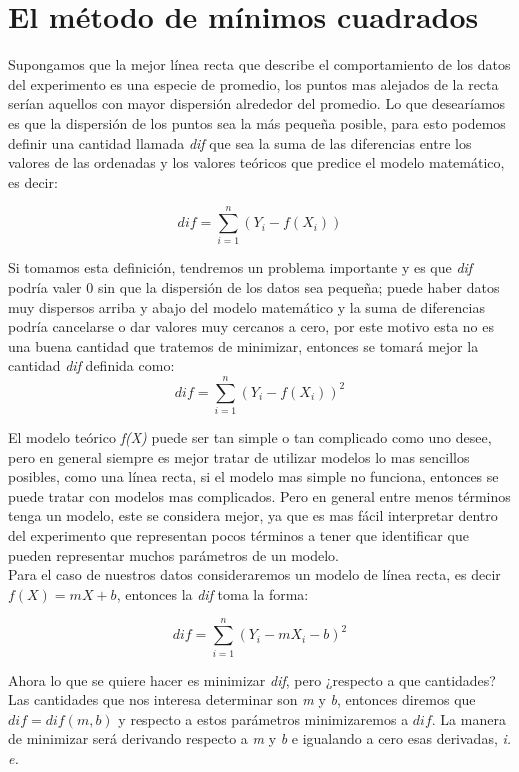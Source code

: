 \documentclass[12pt,letterpaper]{report}
\begin{document}
\section{El método de mínimos cuadrados}


Supongamos que la mejor línea recta que describe el comportamiento de los datos del experimento es una especie de promedio, los puntos mas alejados de la recta serían aquellos con mayor dispersión alrededor del promedio. Lo que desearíamos es que la dispersión de los puntos sea la más pequeña posible, para esto podemos definir una cantidad llamada \textit{dif} que sea la suma de las diferencias entre los valores de las ordenadas y los valores teóricos que predice el modelo matemático, es decir:

\begin{equation}
dif= \sum_{i=1}^{n}(Y_{i}-f(X_{i}))
\end{equation}

Si tomamos esta definición, tendremos un problema importante y es que \textit{dif} podría valer 0 sin que la dispersión de los datos sea pequeña; puede haber datos muy dispersos arriba y abajo del modelo matemático y la suma de diferencias podría cancelarse o dar valores muy cercanos a cero, por este motivo esta no es una buena cantidad  que tratemos de minimizar, entonces  se tomará mejor la cantidad \textit{dif} definida como:
\begin{equation}\label{eqdif}
dif= \sum_{i=1}^{n}(Y_{i}-f(X_{i}))^{2}
\end{equation}

El modelo teórico \textit{f(X)} puede ser tan simple o tan complicado como uno desee, pero en general siempre es mejor tratar de utilizar modelos lo mas sencillos posibles, como una línea recta, si el modelo mas simple no funciona, entonces se puede tratar con modelos mas complicados. Pero en general entre menos términos tenga un modelo, este se considera mejor, ya que es mas fácil interpretar dentro del experimento que representan pocos términos a tener que identificar que pueden representar muchos parámetros de un modelo.\\

Para el caso de nuestros datos consideraremos un modelo de línea recta, es decir $ f(X)= mX + b $, entonces la \textit{dif} toma la forma:

\begin{equation}
dif= \sum_{i=1}^{n}(Y_{i}-mX_{i}-b)^{2}
\end{equation}

Ahora lo que se quiere hacer es minimizar \textit{dif}, pero  ¿respecto a que cantidades? Las cantidades que nos interesa determinar son \textit{m} y \textit{b}, entonces diremos que $ dif=dif(m,b) $ y respecto a estos parámetros minimizaremos a $ dif $. La manera de minimizar será derivando respecto a \textit{m} y \textit{b} e igualando a cero esas derivadas, \textit{i. e.}
\end{document}
